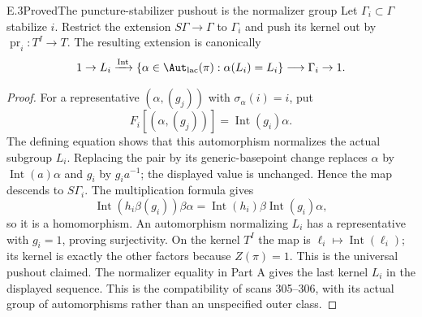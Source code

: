 \begin{claim}{E.3}{Proved}{The puncture-stabilizer pushout is the normalizer group}
Let $\Gamma_i\subset\Gamma$ stabilize $i$. Restrict the extension
$S\Gamma\to\Gamma$ to $\Gamma_i$ and push its kernel out by
$\operatorname{pr}_i:T^I\to T$. The resulting extension is canonically
\[
 1\to L_i\xrightarrow{\operatorname{Int}}
 \{\alpha\in\Aut_{\rm lac}(\pi):\alpha(L_i)=L_i\}
 \longrightarrow\Gamma_i\to1.
\]
\end{claim}
\begin{proof}
For a representative $(\alpha,(g_j))$ with $\sigma_\alpha(i)=i$, put
\[
 F_i[(\alpha,(g_j))]=\operatorname{Int}(g_i)\alpha.
\]
The defining equation shows that this automorphism normalizes the
actual subgroup $L_i$. Replacing the pair by its generic-basepoint
change replaces $\alpha$ by $\operatorname{Int}(a)\alpha$ and $g_i$ by
$g_i a^{-1}$; the displayed value is unchanged. Hence the map descends
to $S\Gamma_i$. The multiplication formula gives
\[
 \operatorname{Int}(h_i\beta(g_i))\beta\alpha
 =\operatorname{Int}(h_i)\beta\operatorname{Int}(g_i)\alpha,
\]
so it is a homomorphism. An automorphism normalizing $L_i$ has a
representative with $g_i=1$, proving surjectivity. On the kernel $T^I$
the map is $\ell_i\mapsto\operatorname{Int}(\ell_i)$; its kernel is
exactly the other factors because $Z(\pi)=1$. This is the universal
pushout claimed. The normalizer equality in Part A gives the last
kernel $L_i$ in the displayed sequence. This is the compatibility of
scans 305--306, with its actual group of automorphisms rather than an
unspecified outer class.
\end{proof}

